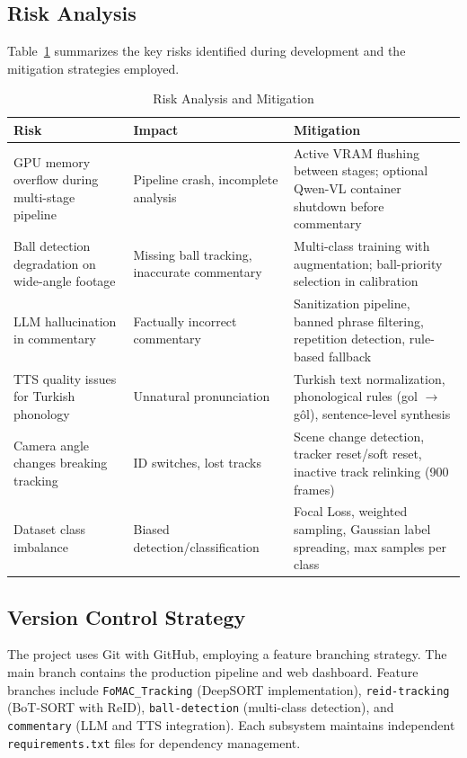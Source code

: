 \documentclass[10pt,twocolumn,a4paper]{article}
\begin{document}
\subsection{Risk Analysis}

Table~\ref{tab:risks} summarizes the key risks identified during development and the mitigation strategies employed.

\begin{table}[H]
\centering
\caption{Risk Analysis and Mitigation}
\label{tab:risks}
\scriptsize
\begin{tabularx}{\columnwidth}{l X X}
\toprule
\textbf{Risk} & \textbf{Impact} & \textbf{Mitigation} \\
\midrule
GPU memory overflow during multi-stage pipeline & Pipeline crash, incomplete analysis & Active VRAM flushing between stages; optional Qwen-VL container shutdown before commentary \\
\midrule
Ball detection degradation on wide-angle footage & Missing ball tracking, inaccurate commentary & Multi-class training with augmentation; ball-priority selection in calibration \\
\midrule
LLM hallucination in commentary & Factually incorrect commentary & Sanitization pipeline, banned phrase filtering, repetition detection, rule-based fallback \\
\midrule
TTS quality issues for Turkish phonology & Unnatural pronunciation & Turkish text normalization, phonological rules (gol $\rightarrow$ g\^{o}l), sentence-level synthesis \\
\midrule
Camera angle changes breaking tracking & ID switches, lost tracks & Scene change detection, tracker reset/soft reset, inactive track relinking (900 frames) \\
\midrule
Dataset class imbalance & Biased detection/classification & Focal Loss, weighted sampling, Gaussian label spreading, max samples per class \\
\bottomrule
\end{tabularx}
\end{table}

\subsection{Version Control Strategy}

The project uses Git with GitHub, employing a feature branching strategy. The main branch contains the production pipeline and web dashboard. Feature branches include \texttt{FoMAC\_Tracking} (DeepSORT implementation), \texttt{reid-tracking} (BoT-SORT with ReID), \texttt{ball-detection} (multi-class detection), and \texttt{commentary} (LLM and TTS integration). Each subsystem maintains independent \texttt{requirements.txt} files for dependency management.
\end{document}
